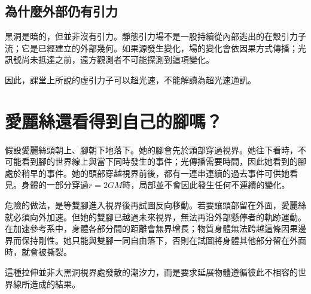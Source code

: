 \subsection{為什麼外部仍有引力}

黑洞是暗的，但並非沒有引力。靜態引力場不是一股持續從內部逃出的在殼引力子流；它是已經建立的外部幾何。如果源發生變化，場的變化會依因果方式傳播；光訊號尚未抵達之前，遠方觀測者不可能探測到這項變化。

\begin{classroomqa}
\end{classroomqa}

\begin{classroomqa}
\end{classroomqa}

因此，課堂上所說的虛引力子可以超光速，不能解讀為超光速通訊。

\section{愛麗絲還看得到自己的腳嗎？}

假設愛麗絲頭朝上、腳朝下地落下。她的腳會先於頭部穿過視界。她往下看時，不可能看到腳的世界線上與當下同時發生的事件；光傳播需要時間，因此她看到的腳處於稍早的事件。她的頭部穿越視界前後，都有一連串連續的過去事件可供她看見。身體的一部分穿過\(r=2GM\)時，局部並不會因此發生任何不連續的變化。

危險的做法，是等雙腳進入視界後再試圖反向移動。若要讓頭部留在外面，愛麗絲就必須向外加速。但她的雙腳已越過未來視界，無法再沿外部懸停者的軌跡運動。在加速參考系中，身體各部分間的距離會無界增長；物質身體無法跨越這條因果邊界而保持剛性。她只能與雙腳一同自由落下，否則在試圖將身體其他部分留在外面時，就會被撕裂。

這種拉伸並非大黑洞視界處發散的潮汐力，而是要求延展物體遵循彼此不相容的世界線所造成的結果。

